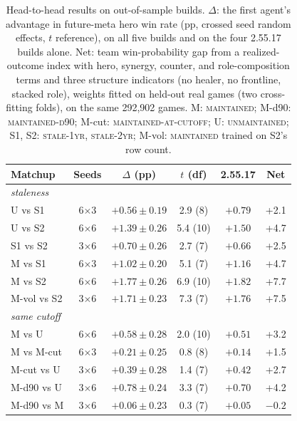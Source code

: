 \documentclass[journal]{IEEEtran}
\newcommand{\maintained}{\textsc{maintained}}          %
\newcommand{\maintainedpred}{\textsc{maintained-d90}}  %
\newcommand{\mcut}{\textsc{maintained-at-cutoff}}      %
\newcommand{\stalefour}{\textsc{unmaintained}}          %
\newcommand{\staleone}{\textsc{stale-1yr}}
\newcommand{\staletwo}{\textsc{stale-2yr}}
\begin{document}
\begin{table}[t]
\caption{Head-to-head results on out-of-sample builds. $\Delta$: the
first agent's advantage in future-meta hero win rate (pp, crossed seed
random effects, $t$ reference), on all five builds and on the four
2.55.17 builds alone. Net: team win-probability gap from a
realized-outcome index with hero, synergy, counter, and
role-composition terms and three structure indicators (no healer, no
frontline, stacked role), weights fitted on held-out real games (two
cross-fitting folds), on the same 292{,}902 games. M: \maintained{};
M-d90: \maintainedpred{}; M-cut: \mcut{}; U: \stalefour{}; S1, S2:
\staleone{}, \staletwo{}; M-vol: \maintained{} trained on S2's row
count.}
\label{tab:dose}
\centering
\footnotesize
\setlength{\tabcolsep}{3pt}
\begin{tabular}{lccccc}
\toprule
Matchup & Seeds & $\Delta$ (pp) & $t$ (df) & 2.55.17 & Net \\
\midrule
\multicolumn{6}{l}{\emph{staleness}} \\
U vs S1 & 6$\times$3 & $+0.56 \pm 0.19$ & 2.9 (8) & $+0.79$ & +2.1 \\
U vs S2 & 6$\times$6 & $+1.39 \pm 0.26$ & 5.4 (10) & $+1.50$ & +4.7 \\
S1 vs S2 & 3$\times$6 & $+0.70 \pm 0.26$ & 2.7 (7) & $+0.66$ & +2.5 \\
M vs S1 & 6$\times$3 & $+1.02 \pm 0.20$ & 5.1 (7) & $+1.16$ & +4.7 \\
M vs S2 & 6$\times$6 & $+1.77 \pm 0.26$ & 6.9 (10) & $+1.82$ & +7.7 \\
M-vol vs S2 & 3$\times$6 & $+1.71 \pm 0.23$ & 7.3 (7) & $+1.76$ & +7.5 \\
\multicolumn{6}{l}{\emph{same cutoff}} \\
M vs U & 6$\times$6 & $+0.58 \pm 0.28$ & 2.0 (10) & $+0.51$ & +3.2 \\
M vs M-cut & 6$\times$3 & $+0.21 \pm 0.25$ & 0.8 (8) & $+0.14$ & +1.5 \\
M-cut vs U & 3$\times$6 & $+0.39 \pm 0.28$ & 1.4 (7) & $+0.42$ & +2.7 \\
M-d90 vs U & 3$\times$6 & $+0.78 \pm 0.24$ & 3.3 (7) & $+0.70$ & +4.2 \\
M-d90 vs M & 3$\times$6 & $+0.06 \pm 0.23$ & 0.3 (7) & $+0.05$ & $-0.2$ \\
\bottomrule
\end{tabular}
\end{table}
\end{document}

